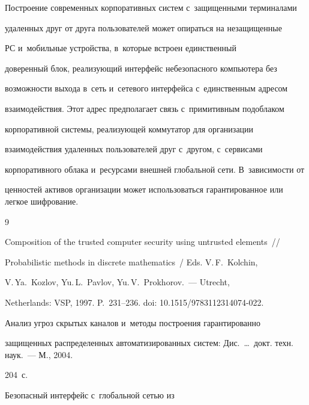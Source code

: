 {  


  Построение современных корпоративных систем с~защищенными терминалами 


удаленных друг от друга пользователей может опираться на незащищенные 


РС и~мобильные устройства, в~которые встроен единственный 


доверенный блок, реализующий интерфейс небезопасного компьютера без 


воз\-мож\-ности выхода в~сеть и~сетевого интерфейса с~единственным адресом 


взаимодействия. Этот адрес предполагает связь с~примитивным подоблаком 


корпоративной сис\-те\-мы, реализующей коммутатор для организации 


взаимодействия удаленных пользователей друг с~другом, с~сервисами 


корпоративного облака и~ресурсами внешней глобальной сети. В~за\-ви\-си\-мости от 


ценностей активов организации может использоваться гарантированное  или легкое шифрование.


  


{\small\frenchspacing


{%




\begin{thebibliography}{9} 




 Composition of the trusted computer security using untrusted elements~/\!\!/ 


Probabilistic methods in discrete mathematics~/ Eds. V.\,F.~Kolchin, 


V.\,Ya.~Kozlov, Yu.\,L.~Pavlov, Yu.\,V.~Prokhorov.~--- Utrecht, 


Netherlands: VSP, 1997. P.~231--236. doi: 10.1515/9783112314074-022.




 Анализ угроз скрытых каналов и~методы построения гарантированно 


защищенных распределенных автоматизированных систем: Дис.\ \ldots\ докт. техн. наук.~--- М., 2004. 


204~с.




 Безопасный интерфейс с~глобальной сетью из 



\end{thebibliography}}}}
